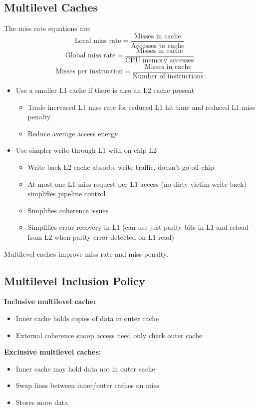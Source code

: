 \documentclass{article}
\begin{document}
\subsection{Multilevel Caches}

The miss rate equations are:
$$ \text{Local miss rate} = \frac{\text{Misses in cache}}{\text{Accesses to cache}} $$
$$ \text{Global miss rate} = \frac{\text{Misses in cache}}{\text{CPU memory accesses}} $$
$$ \text{Misses per instruction} = \frac{\text{Misses in cache}}{\text{Number of instructions}} $$

\begin{itemize}
\item Use a smaller L1 cache if there is also an L2 cache present
\begin{itemize}
\item Trade increased L1 miss rate for reduced L1 hit time and reduced L1 miss penalty
\item Reduce average access energy
\end{itemize}
\item Use simpler write-through L1 with on-chip L2
\begin{itemize}
\item Write-back L2 cache absorbs write traffic, doesn’t go off-chip 
\item At most one L1 miss request per L1 access (no dirty victim write-back) simplifies pipeline control 
\item Simplifies coherence issues 
\item Simplifies error recovery in L1 (can use just parity bits in L1 and reload from L2 when parity error detected on L1 read)
\end{itemize}
\end{itemize}
Multilevel caches improve miss rate and miss penalty.

\subsection{Multilevel Inclusion Policy}

\textbf{Inclusive multilevel cache:}
\begin{itemize}
\item Inner cache holds copies of data in outer cache 
\item External coherence snoop access need only check outer cache
\end{itemize}
\textbf{Exclusive multilevel caches:}
\begin{itemize}
\item Inner cache may hold data not in outer cache 
\item Swap lines between inner/outer caches on miss
\item Stores more data
\end{itemize}
\end{document}
